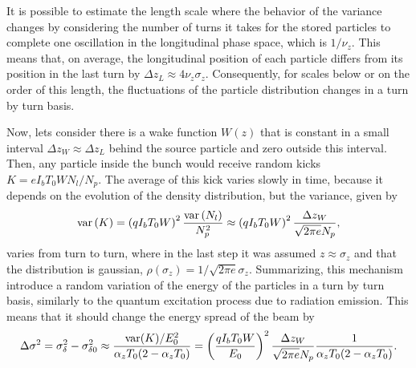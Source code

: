 \begin{apendicesenv}
    It is possible to estimate the length scale where the behavior of the variance changes by considering the number of turns it takes for the stored particles to complete one oscillation in the longitudinal phase space, which is $1/\nu_z$. This means that, on average, the longitudinal position of each particle differs from its position in the last turn by $\Delta z_L \approx 4\nu_z\sigma_z$. Consequently, for scales below or on the order of this length, the fluctuations of the particle distribution changes in a turn by turn basis.

    Now, lets consider there is a wake function $W(z)$ that is constant in a small interval $\Delta z_W \approx \Delta z_L$ behind the source particle and zero outside this interval. Then, any particle inside the bunch would receive random kicks $K = eI_b T_0 W N_l/N_p$. The average of this kick varies slowly in time, because it depends on the evolution of the density distribution, but the variance, given by
    \begin{align}
        \text{var}\left(K\right) = \left(qI_b T_0 W\right)^2 \frac{\text{var}\left(N_l\right)}{N_p^2} \approx
        \left(qI_b T_0 W\right)^2 \frac{\Delta z_W}{\sqrt{2\pi e}N_p},
    \end{align}
    varies from turn to turn, where in the last step it was assumed $z \approx \sigma_z$ and that the distribution is gaussian, $\rho(\sigma_z)=1/\sqrt{2\pi e}\sigma_z$. Summarizing, this mechanism introduce a random variation of the energy of the particles in a turn by turn basis, similarly to the quantum excitation process due to radiation emission. This means that it should change the energy spread of the beam by
    \begin{align}\label{eq:energy_spread_variation}
        \Delta \sigma^2 = \sigma_\delta^2 - \sigma_{\delta0}^2 \approx
        \frac{\text{var}(K)/E_0^2}{\alpha_z T_0(2-\alpha_z T_0)} =
        \left(\frac{qI_b T_0 W}{E_0}\right)^2 \frac{\Delta z_W}{\sqrt{2\pi e}N_p} \frac{1}{\alpha_z T_0(2-\alpha_z T_0)}.
    \end{align}


\end{apendicesenv}
